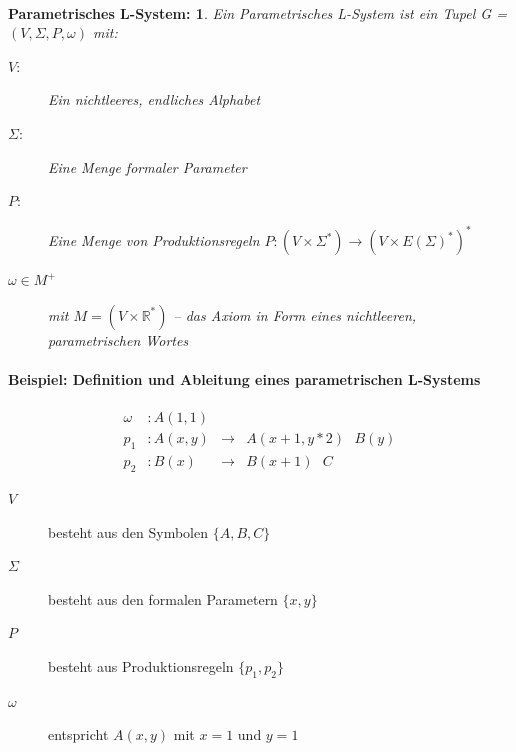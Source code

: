 \newpage
\paragraph{}
\newtheorem{defParametrischeLSysteme}{Parametrisches L-System:}[subsection]
\begin{defParametrischeLSysteme}
	Ein Parametrisches L-System ist ein Tupel G = $(V, \Sigma, P, \omega)$ mit:
	\begin{description}
		\item[\boldmath$V:$] Ein nichtleeres, endliches Alphabet\\
		
		\item[\boldmath$\Sigma:$] Eine Menge formaler Parameter\\
		
		\item[\boldmath$P:$] Eine Menge von Produktionsregeln $P : (V\times \Sigma^*) \rightarrow (V\times E(\Sigma)^*)^*$\\
		
		\item[\boldmath$\omega \in M^+$] mit $M =(V \times \mathbb{R}^*)$ -- das Axiom in Form eines nichtleeren, parametrischen Wortes
	\end{description}
\end{defParametrischeLSysteme}





\newpage
\paragraph{Beispiel: Definition und Ableitung eines parametrischen L-Systems \\}

\begin{equation}
\begin{array}{llll}
\omega & : A(1,1) \\
p_1 & : A(x,y) &\rightarrow& A(x+1, y*2)\text{ }B(y) \\
p_2 &  : B(x) &\rightarrow& B(x+1)\text{ }C 
\end{array}
\label{eq:ProdParamLSystem}
\end{equation} 


\begin{description}
	\item[\boldmath$V$ ] besteht aus den Symbolen $\{A,B,C\}$\\
	
	\item[\boldmath$\Sigma$ ] besteht aus den formalen Parametern $\{x,y\}$\\
	
	\item[\boldmath$P$ ] besteht aus Produktionsregeln $\{p_1, p_2\}$\\
	
	\item[\boldmath$\omega$ ] entspricht $A(x,y)$ mit $x=1$ und $y=1$
\end{description}





